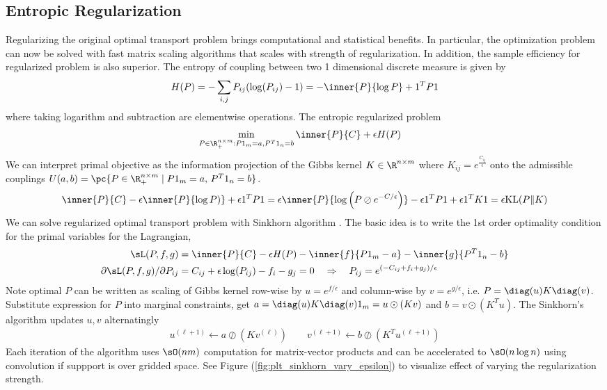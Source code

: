 \documentclass[11pt]{article}
\begin{document}
\subsection{Entropic Regularization}

Regularizing the original optimal transport problem brings computational and statistical benefits. In particular, the optimization problem can now be solved with fast matrix scaling algorithms that scales with strength of regularization. In addition, the sample efficiency for regularized problem is also superior. The entropy of coupling between two 1 dimensional discrete measure is given by
\begin{align}
    H(P)
        = -\sum_{i,j} P_{ij}(\log(P_{ij})-1)
        = - \inner{P}{\log P} + 1^TP1
\end{align}
where taking logarithm and subtraction are elementwise operations. The entropic regularized problem
\begin{align}
    \min_{P\in\R^{n\times m}_+:P1_m=a,P^T1_n=b}\,
        &\inner{P}{C} + \epsilon H(P)
    \label{eq:opt_entropic_regularized_ot}
\end{align}
We can interpret primal objective as the information projection of the Gibbs kernel $K\in\R^{n\times m}$ where $K_{ij}=e^{\frac{C_{ij}}{\epsilon}}$ onto the admissible couplings $U(a,b)=\pc{P\in\R^{n\times m}_+\mid P1_m=a,\, P^T1_n=b}$.
\begin{align}
    \inner{P}{C} - \epsilon\inner{P}{\log P)} + \epsilon 1^T P 1
        = \epsilon \inner{P}{\log\left(P \oslash e^{-C/\epsilon} \right)} - \epsilon 1^TP1 + \epsilon 1^TK1
        = \epsilon \text{KL}(P\Vert K)
\end{align}
We can solve regularized optimal transport problem with Sinkhorn algorithm \cite{cuturiSinkhornDistancesLightspeed2013}. The basic idea is to write the 1st order optimality condition for the primal variables for the Lagrangian,
\begin{align}
    \sL(P,f,g)
        &= \inner{P}{C} - \epsilon H(P) - \inner{f}{P1_m-a}- \inner{g}{P^T1_n-b} \\
    \partial \sL(P,f,g)/\partial P_{ij}
        &= C_{ij} + \epsilon \log(P_{ij}) - f_i - g_j = 0
        \quad\Rightarrow\quad
        P_{ij} = e^{(-C_{ij}+f_i+g_j)/\epsilon}
\end{align}
Note optimal $P$ can be written as scaling of Gibbs kernel row-wise by $u=e^{f/\epsilon}$ and column-wise by $v=e^{g/\epsilon}$, i.e. $P=\diag(u)K \diag(v)$. Substitute expression for $P$ into marginal constraints, get $a = \diag(u) K \diag(v) 1_m = u\odot (Kv)$ and $b = v\odot (K^T u)$. The Sinkhorn's algorithm updates $u,v$ alternatingly
\begin{align}
    u^{(\ell+1)} 
        \leftarrow a \oslash (Kv^{(\ell)}) 
    \quad\quad
    v^{(\ell+1)}
        \leftarrow b \oslash (K^Tu^{(\ell+1)})
\end{align}
Each iteration of the algorithm uses $\sO(nm)$ computation for matrix-vector products and can be accelerated to $\sO(n\log n)$ using convolution if suppport is over gridded space. See Figure (\ref{fig:plt_sinkhorn_vary_epsilon}) to visualize effect of varying the regularization strength.
\end{document}
